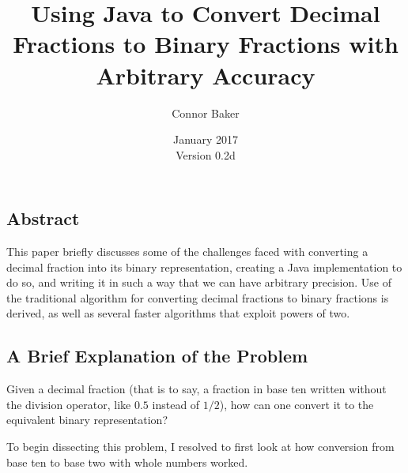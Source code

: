\documentclass[12pt]{article}
\begin{document}

  \title{Using Java to Convert Decimal Fractions to Binary Fractions with Arbitrary Accuracy}
  \author{Connor Baker}
  \date{January 2017\\Version 0.2d}
\maketitle

\begin{center}
\subsection*{Abstract}
\end{center}
This paper briefly discusses some of the challenges faced with converting a decimal fraction into its binary representation, creating a Java implementation to do so, and writing it in such a way that we can have arbitrary precision. Use of the traditional algorithm for converting decimal fractions to binary fractions is derived, as well as several faster algorithms that exploit powers of two.



\newpage %



\makeatletter
{}
\makeatother
\tableofcontents

\clearpage
{}



\newpage %



\begin{center}
\section{A Brief Explanation of the Problem}
\end{center}
Given a decimal fraction (that is to say, a fraction in base ten written without the division operator, like $0.5$ instead of $1/2$), how can one convert it to the equivalent binary representation?

\par To begin dissecting this problem, I resolved to first look at how conversion from base ten to base two with whole numbers worked.
\end{document}
